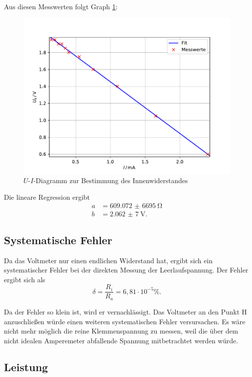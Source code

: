 Aus diesen Messwerten folgt Graph \ref{fig:sinuk}:
\begin{figure}[H]
  \centering
  \includegraphics[width=\textwidth]{Plots/sinuk.pdf}
  \caption{$U$-$I$-Diagramm zur Bestimmung des Innenwiderstandes}
  \label{fig:sinuk}
\end{figure}

Die lineare Regression ergibt
\begin{align*}
  a &= \SI{609,072(6695)}{\ohm} \\
  b &= \SI{2,062(7)}{\V}.
\end{align*}

\subsection{Systematische Fehler \label{sec:sysf}}

Da das Voltmeter nur einen endlichen Widerstand hat, ergibt sich ein systematischer Fehler
bei der direkten Messung der Leerlaufspannung.
Der Fehler ergibt sich als
\begin{equation*}
  \delta = \frac{R_i}{R_a} = 6,81 \cdot 10^{-5} \%.
\end{equation*}

Da der Fehler so klein ist, wird er vernachlässigt.
Das Voltmeter an den Punkt H anzuschließen würde einen weiteren systematischen Fehler versursachen.
Es wäre nicht mehr möglich die reine Klemmenspannung zu messen, weil die über dem nicht idealen Amperemeter
abfallende Spannung mitbetrachtet werden würde.

\subsection{Leistung}

